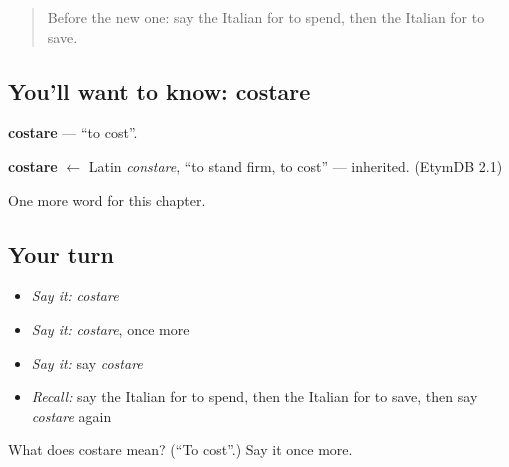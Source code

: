 \begin{quote}
Before the new one: say the Italian for to spend, then the Italian for to save.
\end{quote}

\subsection*{You'll want to know: costare}
\textbf{costare} — \textquotedblleft{}to cost\textquotedblright{}.

\begin{cousinweb}
\textbf{costare} $\leftarrow$ Latin \emph{constare}, \textquotedblleft{}to stand firm, to cost\textquotedblright{} — inherited. (EtymDB 2.1)
\end{cousinweb}

\begin{grammarlens}[title={What you've built}]
One more word for this chapter.
\end{grammarlens}

\subsection*{Your turn}
\begin{itemize}
\raggedright
  \item \emph{Say it:} \emph{costare}
  \item \emph{Say it:} \emph{costare}, once more
  \item \emph{Say it:} say \emph{costare}
  \item \emph{Recall:} say the Italian for to spend, then the Italian for to save, then say \emph{costare} again
\end{itemize}

\begin{tcolorbox}[breakable,colback=teal!4,colframe=teal!35!black,title={Before you move on}]
What does costare mean? (\textquotedblleft{}To cost\textquotedblright{}.) Say it once more.
\end{tcolorbox}
